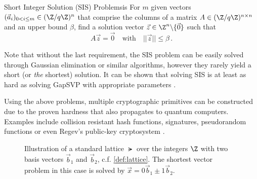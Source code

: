 \begin{definition}{Short Integer Solution (SIS) Problem}{sis}
  For $m$ given vectors $(\vec{a}_i)_{0 < i \leq m} \in (\Z / q\Z)^n$ that comprise the columns of a matrix
  $A \in (\Z / q\Z)^{n \times n}$ and an upper bound $\beta$, find
  a solution vector $\vec{z} \in \Z^n \backslash \{\vec{0}\}$ such that
  $$A \vec{z} = \vec{0} \quad \mathrm{with} \quad ||\vec{z}|| \leq \beta\,.$$
\end{definition}

Note that without the last requirement, the SIS problem can be easily solved through Gaussian elimination or
similar algorithms, however they rarely yield a short (or \textit{the} shortest) solution.
It can be shown that solving SIS is at least as hard as solving GapSVP with appropriate parameters
\parencite{1996-hard-lattice-problems}.

Using the above problems, multiple cryptographic primitives can be constructed
due to the proven hardness that also propagates to quantum computers.
Examples include collision resistant hash functions, signatures, pseudorandom functions
or even Regev's public-key cryptosystem \parencite{2016-decade-of-lattice}.

\usetikzlibrary{calc}
\begin{figure}
  \centering
  \caption{Illustration of a standard lattice $\lat$ over the integers $\Z$
    with two basis vectors $\vec{b}_1$ and $\vec{b}_2$, c.f. \autoref{def:lattice}.
    The shortest vector problem in this case is solved by $\vec{x} = 0 \vec{b}_1 \pm 1 \vec{b}_2$.}
  \label{fig:lattice}
\end{figure}

